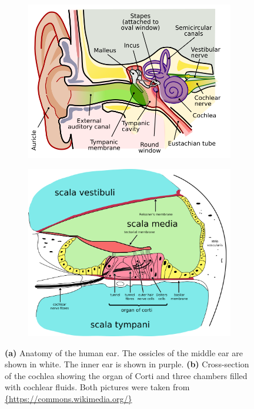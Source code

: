 \begin{figure}[t]
	\centering
	\begin{subfigure}{0.5\textwidth}
		\centering
		\includegraphics[width=\linewidth]{include/anatomy_of_the_human_ear}
		\caption{}
		\label{img:anatomy_human_ear}
	\end{subfigure}%
	\begin{subfigure}{0.5\textwidth}
		\centering
		\includegraphics[width=\linewidth]{include/cochlea_cross_section}
		\caption{}
		\label{img:cochlea_cross_section}
	\end{subfigure}
	\caption[Anatomy of the human ear]{\textbf{(a)} Anatomy of the human ear. The ossicles of the middle ear are shown in white. The inner ear is shown in purple. \textbf{(b)} Cross-section of the cochlea showing the organ of Corti and three chambers filled with cochlear fluids. Both pictures were taken from \url{{https://commons.wikimedia.org/}}}
\end{figure}

